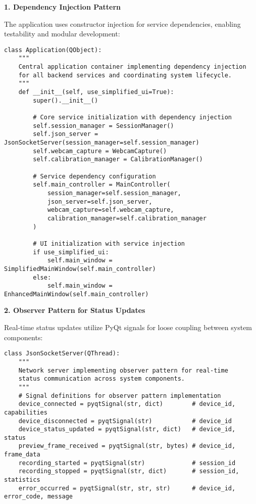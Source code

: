 \documentclass[12pt,a4paper]{article}
\begin{document}
\textbf{1. Dependency Injection Pattern}

The application uses constructor injection for service dependencies, enabling testability and modular development:

\begin{verbatim}
class Application(QObject):
    """
    Central application container implementing dependency injection
    for all backend services and coordinating system lifecycle.
    """
    def __init__(self, use_simplified_ui=True):
        super().__init__()
        
        # Core service initialization with dependency injection
        self.session_manager = SessionManager()
        self.json_server = JsonSocketServer(session_manager=self.session_manager)
        self.webcam_capture = WebcamCapture()
        self.calibration_manager = CalibrationManager()
        
        # Service dependency configuration
        self.main_controller = MainController(
            session_manager=self.session_manager,
            json_server=self.json_server,
            webcam_capture=self.webcam_capture,
            calibration_manager=self.calibration_manager
        )
        
        # UI initialization with service injection
        if use_simplified_ui:
            self.main_window = SimplifiedMainWindow(self.main_controller)
        else:
            self.main_window = EnhancedMainWindow(self.main_controller)
\end{verbatim}

\textbf{2. Observer Pattern for Status Updates}

Real-time status updates utilize PyQt signals for loose coupling between system components:

\begin{verbatim}
class JsonSocketServer(QThread):
    """
    Network server implementing observer pattern for real-time
    status communication across system components.
    """
    # Signal definitions for observer pattern implementation
    device_connected = pyqtSignal(str, dict)        # device_id, capabilities
    device_disconnected = pyqtSignal(str)           # device_id
    device_status_updated = pyqtSignal(str, dict)   # device_id, status
    preview_frame_received = pyqtSignal(str, bytes) # device_id, frame_data
    recording_started = pyqtSignal(str)             # session_id
    recording_stopped = pyqtSignal(str, dict)       # session_id, statistics
    error_occurred = pyqtSignal(str, str, str)      # device_id, error_code, message
\end{verbatim}
\end{document}
